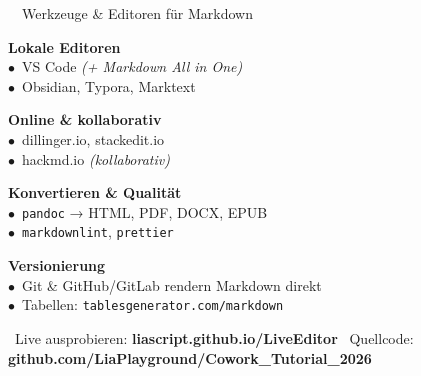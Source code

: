 \documentclass[a4paper,landscape,9pt]{extarticle}
\begin{document}
\noindent
\begin{mdinfo}{\faToolbox~~Werkzeuge \& Editoren für Markdown}
\footnotesize
\begin{minipage}[t]{0.24\linewidth}
\textbf{\color{mdblue}Lokale Editoren}\\[1pt]
$\bullet$~VS Code \textit{(+ Markdown All in One)}\\
$\bullet$~Obsidian, Typora, Marktext
\end{minipage}\hfill
\begin{minipage}[t]{0.22\linewidth}
\textbf{\color{mdblue}Online \& kollaborativ}\\[1pt]
$\bullet$~dillinger.io, stackedit.io\\
$\bullet$~hackmd.io \textit{(kollaborativ)}
\end{minipage}\hfill
\begin{minipage}[t]{0.24\linewidth}
\textbf{\color{mdblue}Konvertieren \& Qualität}\\[1pt]
$\bullet$~\texttt{pandoc} → HTML, PDF, DOCX, EPUB\\
$\bullet$~\texttt{markdownlint}, \texttt{prettier}
\end{minipage}\hfill
\begin{minipage}[t]{0.25\linewidth}
\textbf{\color{mdblue}Versionierung}\\[1pt]
$\bullet$~Git \& GitHub/GitLab rendern Markdown direkt\\
$\bullet$~Tabellen: \texttt{tablesgenerator.com/markdown}
\end{minipage}
\end{mdinfo}

\vfill
{\sffamily\scriptsize\color{muted}
\faInfoCircle~Live ausprobieren: \textbf{liascript.github.io/LiveEditor}\hfill
\faGithub~Quellcode: \textbf{github.com/LiaPlayground/Cowork\_Tutorial\_2026}}

\newpage
\end{document}
